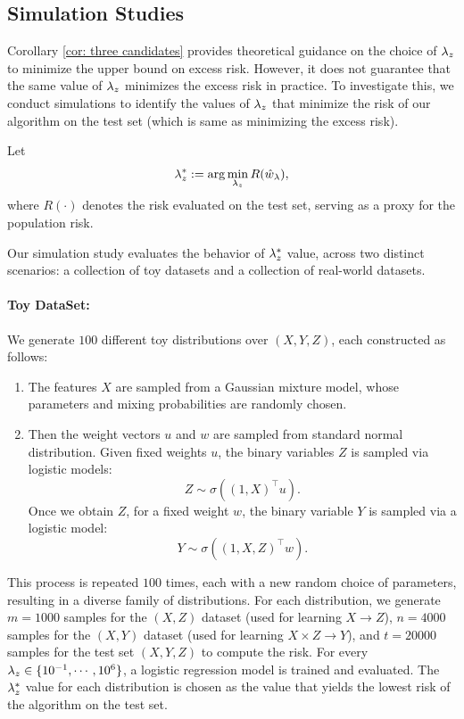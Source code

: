 \subsection{Simulation Studies}

Corollary \ref{cor: three candidates} provides theoretical guidance on the choice of $\lambda_z$ to minimize the upper bound on excess risk. However, it does not guarantee that the same value of $\lambda_z$ minimizes the excess risk in practice. To investigate this, we conduct simulations to identify the values of $\lambda_z$ that minimize the risk of our algorithm on the test set (which is same as minimizing the excess risk).

Let 
\begin{equation*}
    \lambda_z^* := \arg\min_{\lambda_z} R(\hat{w}_\lambda),
\end{equation*}
 where $R(\cdot)$ denotes the risk evaluated on the test set, serving as a proxy for the population risk.

Our simulation study evaluates the behavior of $\lambda_z^*$ value, across two distinct scenarios: a collection of toy datasets and a collection of real-world datasets. 
\paragraph{Toy DataSet:}
We generate $100$ different toy distributions over $(X, Y, Z)$, each constructed as follows:

\begin{enumerate}
    \item The features $X$ are sampled from a Gaussian mixture model, whose parameters and mixing probabilities are randomly chosen.
    
    \item Then the weight vectors $u$ and $w$ are sampled from standard normal distribution.    
    Given fixed weights $u$, the binary variables $Z$ is sampled via logistic models:
    \[ Z \sim \sigma((1,X)^\top u).\]
    Once we obtain $Z$, for a fixed weight $w$, the binary variable $Y$ is sampled via a logistic model:
    \[ Y \sim \sigma((1,X,Z)^\top w).\]
    
\end{enumerate}

This process is repeated $100$ times, each with a new random choice of parameters, resulting in a diverse family of distributions. For each distribution, we generate $m=1000$ samples for the $(X, Z)$ dataset (used for learning $X \to Z$), $n=4000$ samples for the $(X, Y)$ dataset (used for learning $X \times Z \to Y$), and $t=20000$ samples for the test set $(X, Y, Z)$ to compute the risk. 
For every $\lambda_z \in \{10^{-1}, \cdots, 10^6\}$,
a logistic regression model is trained and evaluated. The $\lambda_z^*$ value for each distribution is chosen as the value that yields the lowest risk of the algorithm on the test set.

